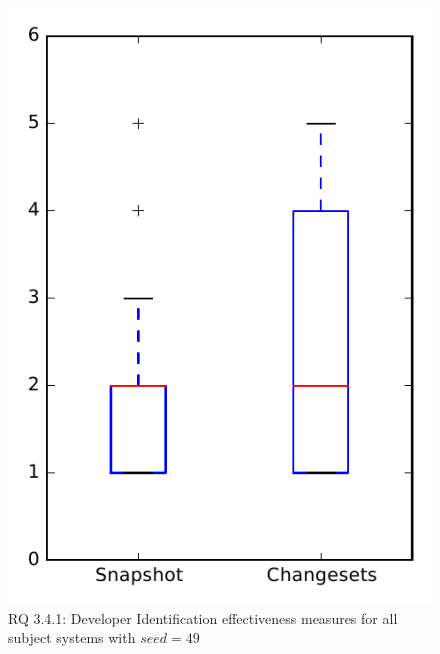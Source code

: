 
\begin{figure}
\centering
\includegraphics[height=0.4\textheight]{figures/dit_seed/rq1_overview_49}
\caption{RQ 3.4.1: Developer Identification effectiveness measures for all subject systems with $seed=49$}
\label{fig:dit_seed:rq1:overview}
\end{figure}
